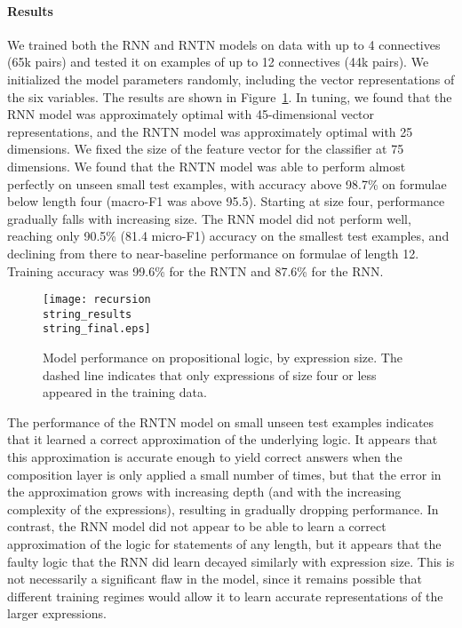 \paragraph{Results} 
We trained both the RNN and RNTN models on data with up to 4
connectives (65k pairs) and tested it on examples of up to 12
connectives (44k pairs). We initialized the model parameters randomly,
including the vector representations of the six variables. The results
are shown in Figure~\ref{prop-results}. In tuning, we found that the
RNN model was approximately optimal with 45-dimensional vector
representations, and the RNTN model was approximately optimal with 25
dimensions. We fixed the size of the feature vector for the classifier
at 75 dimensions. We found that the RNTN model was able to perform
almost perfectly on unseen small test examples, with accuracy above
98.7\% on formulae below length four (macro-F1 was above 95.5).
Starting at size four, performance gradually falls with increasing
size.  The RNN model did not perform well, reaching only 90.5\% (81.4
micro-F1) accuracy on the smallest test examples, and declining from
there to near-baseline performance on formulae of length 12. Training
accuracy was 99.6\% for the RNTN and 87.6\% for the RNN.


\begin{figure}[tp]
  \centering
  \texttt{[image: recursion\\string\_results\\string\_final.eps]}
  \caption{Model performance on propositional logic, by expression size. 
    The dashed line indicates that only expressions of size four or less appeared in the training data.}  
  \label{prop-results}
\end{figure}

The performance of the RNTN model on small unseen test examples
indicates that it learned a correct approximation of the underlying
logic. It appears that this approximation is accurate enough to yield
correct answers when the composition layer is only applied a small
number of times, but that the error in the approximation grows with
increasing depth (and with the increasing complexity of the
expressions), resulting in gradually dropping performance. In
contrast, the RNN model did not appear to be able to learn a correct
approximation of the logic for statements of any length, but it
appears that the faulty logic that the RNN did learn decayed similarly
with expression size.  This is not necessarily a significant flaw in the model, since it remains possible that  different training regimes would allow it to learn accurate representations of the larger expressions. 


